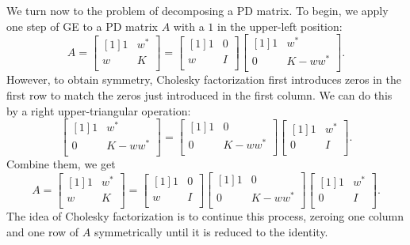 We turn now to the problem of decomposing a PD matrix. To begin, we apply one step of GE to a PD matrix $A$ with a $1$ in the upper-left position: 
\[
    A = \begin{bmatrix}[1] 
        1 &  w^* \\
        w &  K \\
    \end{bmatrix} 
    = 
    \begin{bmatrix}[1] 
        1 &  0 \\
        w &  I \\
    \end{bmatrix}
    \begin{bmatrix}[1] 
        1 &  w^* \\
        0 &  K-ww^* \\
    \end{bmatrix}.   
\]
However, to obtain symmetry, Cholesky factorization first introduces zeros in the first row to match the zeros just introduced in the first column. We can do this by a right upper-triangular operation:
\[
    \begin{bmatrix}[1] 
        1 &  w^* \\
        0 &  K-ww^* \\
    \end{bmatrix}
    = 
    \begin{bmatrix}[1] 
        1 & 0 \\
        0 &  K-ww^* \\
    \end{bmatrix} 
    \begin{bmatrix}[1] 
        1 &  w^* \\
        0 &  I \\
    \end{bmatrix}.    
\]
Combine them, we get 
\begin{equation}
\label{eq: symmetric GE}
    A = \begin{bmatrix}[1] 
        1 &  w^* \\
        w &  K \\
    \end{bmatrix}
    = 
    \begin{bmatrix}[1] 
        1 & 0  \\
        w & I  \\
    \end{bmatrix}
    \begin{bmatrix}[1] 
        1 &  0 \\
        0 &  K-ww^* \\
    \end{bmatrix}   
    \begin{bmatrix}[1] 
        1 &  w^* \\
        0 &  I \\
    \end{bmatrix}.  
\end{equation}
The idea of Cholesky factorization is to continue this process, zeroing one column and one row of $A$ symmetrically until it is reduced to the identity.

